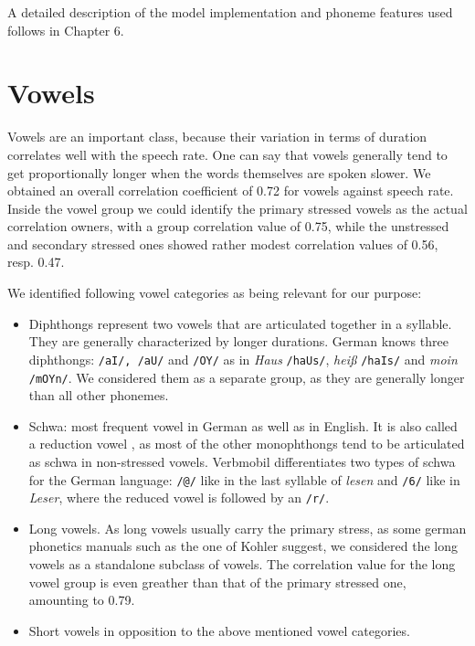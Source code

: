 \documentclass[a4paper]{scrreprt}
\begin{document}
A detailed description of the model implementation and phoneme features used follows in Chapter 6.

\section{Vowels}
Vowels are an important class, because their variation in terms of duration correlates well with the speech rate. One can say that vowels generally tend to get proportionally longer when the words themselves are spoken slower. We obtained an overall correlation coefficient of 0.72 for vowels against speech rate. Inside the vowel group we could identify the primary stressed vowels as the actual correlation owners, with a group correlation value of 0.75, while the unstressed and secondary stressed ones showed rather modest correlation values of 0.56, resp. 0.47. 

We identified following vowel categories as being relevant for our purpose:

\begin{itemize}
	\item Diphthongs represent two vowels that are articulated together in a syllable. They are generally characterized by longer durations. German knows three diphthongs: \texttt{/aI/, /aU/} and \texttt{/OY/} as in \textit{Haus} \texttt{/haUs/},  \textit{heiß} \texttt{/haIs/} and \textit{moin} \texttt{/mOYn/}. We considered them as a separate group, as they are generally longer than all other phonemes.
	\item Schwa: most frequent vowel in German as well as in English. It is also called a reduction vowel \cite{Kohler1995}, as most of the other monophthongs tend to be articulated as schwa in non-stressed vowels. Verbmobil differentiates two types of schwa for the German language: \texttt{/@/} like in the last syllable of \textit{lesen} and \texttt{/6/} like in \textit{Leser}, where the reduced vowel is followed by an \texttt{/r/}.
	\item Long vowels. As long vowels usually carry the primary stress, as some german phonetics manuals such as the one of Kohler \cite{Kohler1995} suggest, we considered the long vowels as a standalone subclass of vowels. The correlation value for the long vowel group is even greather than that of the primary stressed one, amounting to 0.79.
	\item Short vowels in opposition to the above mentioned vowel categories.
\end{itemize}
\end{document}

